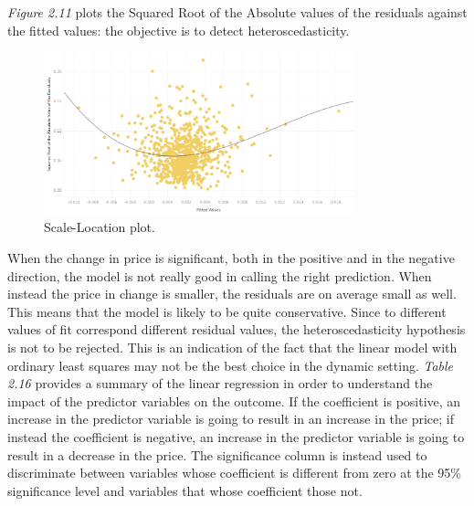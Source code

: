 \documentclass{book}
\begin{document}
\textit{Figure 2.11} plots the Squared Root of the Absolute values of the residuals against the fitted values: the objective is to detect heteroscedasticity.

\bigskip
\begin{figure}[H]
\begin{center}
\captionsetup{justification=centering}
\includegraphics[width=0.8\textwidth]{Images/hetero.png}
\caption{Scale-Location plot.}
\end{center}
\end{figure}
\bigskip

When the change in price is significant, both in the positive and in the negative direction, the model is not really good in calling the right prediction. When instead the price in change is smaller, the residuals are on average small as well. This means that the model is likely to be quite conservative. Since to different values of fit correspond different residual values, the heteroscedasticity hypothesis is not to be rejected. This is an indication of the fact that the linear model with ordinary least squares may not be the best choice in the dynamic setting. \textit{Table 2.16} provides a summary of the linear regression in order to understand the impact of the predictor variables on the outcome. If the coefficient is positive, an increase in the predictor variable is going to result in an increase in the price; if instead the coefficient is negative, an increase in the predictor variable is going to result in a decrease in the price. The significance column is instead used to discriminate between variables whose coefficient is different from zero at the 95\% significance level and variables that whose coefficient those not.
\end{document}
